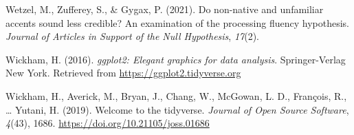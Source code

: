 \documentclass[
  man,floatsintext]{apa7}
\newlength{\cslhangindent}
\newlength{\cslentryspacingunit} %
\newenvironment{CSLReferences}[2] %
 {%
  \setlength{\parindent}{0pt}
  \ifodd #1
  \let\oldpar\par
  \def\par{\hangindent=\cslhangindent\oldpar}
  \fi
  \setlength{\parskip}{#2\cslentryspacingunit}
 }%
 {}
\begin{document}
\begin{CSLReferences}{1}{0}
\leavevmode{}%
Wetzel, M., Zufferey, S., \& Gygax, P. (2021). Do non-native and unfamiliar accents sound less credible? An examination of the processing fluency hypothesis. \emph{Journal of Articles in Support of the Null Hypothesis}, \emph{17}(2).

\leavevmode{}%
Wickham, H. (2016). \emph{ggplot2: Elegant graphics for data analysis}. Springer-Verlag New York. Retrieved from \url{https://ggplot2.tidyverse.org}

\leavevmode{}%
Wickham, H., Averick, M., Bryan, J., Chang, W., McGowan, L. D., François, R., \ldots{} Yutani, H. (2019). Welcome to the {tidyverse}. \emph{Journal of Open Source Software}, \emph{4}(43), 1686. \url{https://doi.org/10.21105/joss.01686}

\end{CSLReferences}


\clearpage
\renewcommand{\listfigurename}{Figure captions}

\clearpage
\renewcommand{\listtablename}{Table captions}
\end{document}
